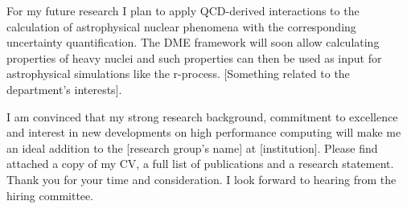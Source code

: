 \quad

For my future research I plan to apply QCD-derived interactions to the
calculation of astrophysical nuclear phenomena with the corresponding
uncertainty quantification. The DME framework will soon allow
calculating properties of heavy nuclei and such properties can then be
used as input for astrophysical simulations like the
r-process. [Something related to the department's interests].

\quad


I am convinced that my strong research background, commitment to
excellence and interest in new developments on high performance
computing will make me an ideal addition to the [research group's
name] at [institution]. Please find attached a copy of my CV, a full
list of publications and a research statement. Thank you for your time
and consideration. I look forward to hearing from the hiring
committee.

\quad

\makeletterclosing
